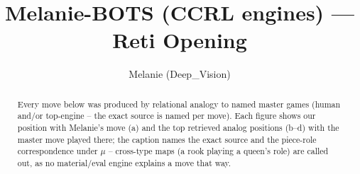 \documentclass[11pt]{article}
\title{Melanie-BOTS (CCRL engines) — Reti Opening}
\author{Melanie (Deep\_Vision)}
\date{}
\begin{document}
\maketitle

\begin{abstract}Every move below was produced by relational analogy to named master games (human and/or top-engine -- the exact source is named per move). Each figure shows our position with Melanie's move (a) and the top retrieved analog positions (b--d) with the master move played there; the caption names the exact source and the piece-role correspondence under $\mu$ -- cross-type maps (a rook playing a queen's role) are called out, as no material/eval engine explains a move that way.\end{abstract}

\begin{figure}[p]\centering
\begin{subfigure}{0.46\textwidth}\centering
\resizebox{\linewidth}{!}{%
\newchessgame
\chessboard[
  setfen={rnbq1rk1/pp2bppp/4pn2/2pp4/2P5/PP3NP1/3PPPBP/RNBQ1RK1 b - - 0 7},
  showmover=false,
  pgfstyle=straightmove, color=movearrow, markmove={a7-a5}
]}
\caption{}
\end{subfigure}\hfill
\begin{subfigure}{0.46\textwidth}\centering
\resizebox{\linewidth}{!}{%
\newchessgame
\chessboard[
  setfen={rnbq1rk1/ppp1bppp/4pn2/3p4/2P5/1P3NP1/P2PPPBP/RNBQ1RK1 b - - 4 6},
  showmover=false,
  pgfstyle=straightmove, color=movearrow, markmove={c7-c5}
]}
\caption{}
\end{subfigure}
\\[4pt]
\begin{subfigure}{0.46\textwidth}\centering
\resizebox{\linewidth}{!}{%
\newchessgame
\chessboard[
  setfen={rnbq1rk1/ppp1bppp/4pn2/3p4/2P5/1P3NP1/P2PPPBP/RNBQ1RK1 b - - 4 6},
  showmover=false,
  pgfstyle=straightmove, color=movearrow, markmove={c7-c5}
]}
\caption{}
\end{subfigure}\hfill
\begin{subfigure}{0.46\textwidth}\centering
\resizebox{\linewidth}{!}{%
\newchessgame
\chessboard[
  setfen={rnbq1rk1/ppp1bppp/4pn2/3p4/2P5/1P3NP1/P2PPPBP/RNBQ1RK1 b - - 0 6},
  showmover=false,
  pgfstyle=straightmove, color=movearrow, markmove={c7-c5}
]}
\caption{}
\end{subfigure}

\end{figure}
\end{document}
